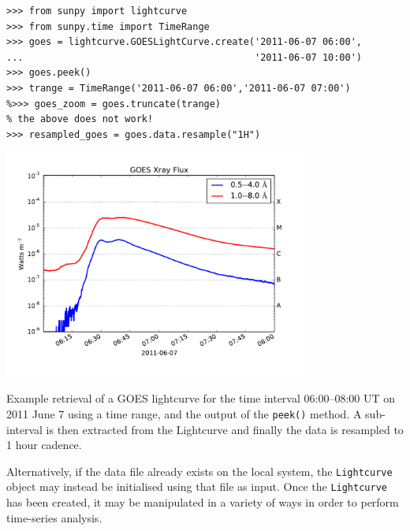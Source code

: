 \begin{listing}[H]
\begin{verbatim}
>>> from sunpy import lightcurve
>>> from sunpy.time import TimeRange
>>> goes = lightcurve.GOESLightCurve.create('2011-06-07 06:00',
...                                         '2011-06-07 10:00')
>>> goes.peek()
>>> trange = TimeRange('2011-06-07 06:00','2011-06-07 07:00')
%>>> goes_zoom = goes.truncate(trange)
% the above does not work!
>>> resampled_goes = goes.data.resample("1H")
\end{verbatim}
\begin{center}
\includegraphics[width=10cm]{goes_lightcurve.pdf}
\end{center}
\caption{Example retrieval of a GOES lightcurve for the time interval 06:00--08:00 UT on 
2011 June 7 using a time range, and the output of the \texttt{peek()} method.
A sub-interval is then extracted from the Lightcurve and finally the data is resampled
to 1 hour cadence.}
\label{code:goes_lc}
\end{listing}

Alternatively, if the data file already exists on the local system, the 
\texttt{Lightcurve} object may instead be initialised using that file as input.
Once the \texttt{Lightcurve} has been created, it may be manipulated in 
a variety of ways in order to perform time-series analysis. 